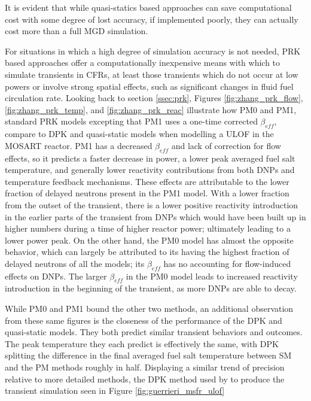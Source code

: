 \documentclass[review]{elsarticle}
\begin{document}
It is evident that while quasi-statics based approaches can save computational
 cost with some
degree of lost accuracy, if implemented poorly, they can actually cost more than
a full MGD simulation.
\par For situations in which a high degree of simulation accuracy is not needed,
PRK based approaches offer a computationally inexpensive means with which to
simulate transients in CFRs, at least those transients which do not occur at
low powers or involve strong spatial effects, such as significant changes in
fluid fuel circulation rate.
Looking back to section \ref{ssec:prk}, Figures
\ref{fig:zhang_prk_flow}, \ref{fig:zhang_prk_temp}, and 
\ref{fig:zhang_prk_reac} illustrate how PM0 and PM1,
standard PRK models excepting that PM1 uses a one-time corrected $\beta_{eff}$,
compare to DPK and quasi-static models when modelling a ULOF in
the MOSART reactor. PM1 has a decreased $\beta_{eff}$ and lack of correction
for flow effects, so it predicts a faster decrease in power, a lower
peak averaged fuel salt temperature, and generally lower reactivity
contributions from both DNPs and temperature feedback mechanisms. These
effects are attributable to the lower fraction of delayed neutrons present
in the PM1 model. With a lower fraction from the outset of the transient, there
is a lower positive reactivity introduction in the earlier parts of the
transient from DNPs which would have been built up in higher numbers during
a time of higher reactor power; ultimately leading to a lower power peak.
On the other hand, the PM0 model has almost
the opposite behavior, which can largely be attributed to its having the
highest fraction of delayed neutrons of all the models; its $\beta_{eff}$
has no accounting for flow-induced effects on DNPs. The larger
$\beta_{eff}$ in the PM0 model leads to increased reactivity introduction
in the beginning of the transient, as more DNPs are able to decay.
\par While PM0 and PM1 bound the other two methods, an additional observation
 from
these same figures is the closeness of the performance of the DPK and
quasi-static models. They both predict similar transient
behaviors and outcomes. The peak temperature they each predict is effectively
the same, with DPK splitting the difference in the final averaged fuel salt
temperature between SM and the PM methods roughly in half. Displaying
a similar trend of precision relative to more detailed methods, the DPK method
 used by \cite{guerrieri_investigation_2013} to produce
the transient simulation seen in Figure \ref{fig:guerrieri_msfr_ulof}
\end{document}
